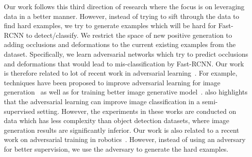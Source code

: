 Our work follows this third direction of research where the focus is on leveraging data in a better manner. However, instead of trying to sift through the data to find hard examples, we try to generate examples which will be hard for Fast-RCNN to detect/classify. We restrict the space of new positive generation to adding occlusions and deformations to the current existing examples from the dataset. Specifically, we learn adversarial networks which try to predict occlusions and deformations that would lead to mis-classification by Fast-RCNN. Our work is therefore related to lot of recent work in adversarial learning~\cite{goodfellow2014generative,Denton15,Alec15,Mirza15,MathieuCL15,improvedGAN,pathakCVPR16context,CatGAN15,pix2pix2016}. 
For example, techniques have been proposed to improve adversarial learning for image generation~\cite{Alec15} as well as for training better image generative model~\cite{improvedGAN}.
\cite{improvedGAN} also highlights that the adversarial learning can improve image classification in a semi-supervised setting. However, the experiments in these works are conducted on data which has less complexity than object detection datasets, where image generation results are significantly inferior. Our work is also related to a recent work on adversarial training in robotics~\cite{pinto16}. However, instead of using an adversary for better supervision, we use the adversary to generate the hard examples.

